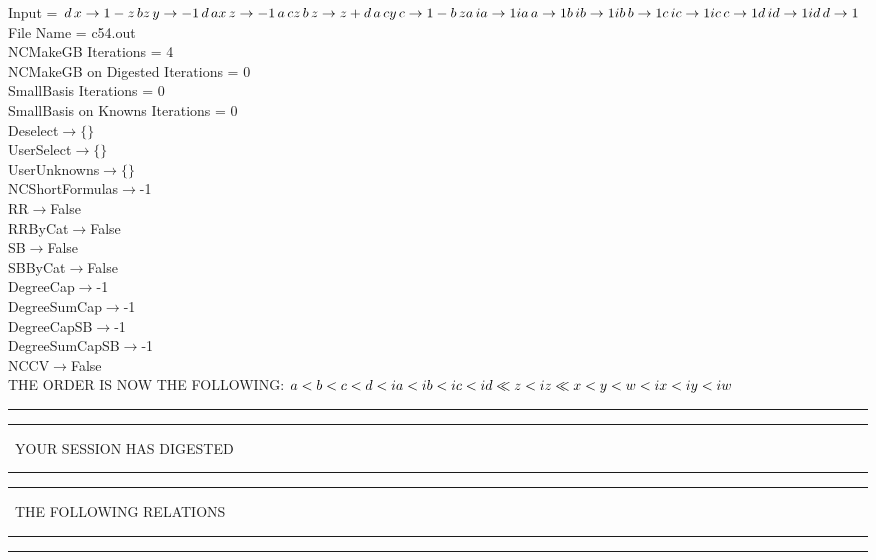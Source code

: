 \documentclass[rep10,leqno]{report}
\begin{document}
\normalsize
\baselineskip=12pt
\noindent
Input = 
$
\\d\,
 x\rightarrow 1 - z\,
 b\\
z\,
 y\rightarrow -1\,
 d\,
 a\\
x\,
 z\rightarrow -1\,
 a\,
 c\\
z\,
 b\,
 z\rightarrow z + d\,
 a\,
 c\\
y\,
 c\rightarrow 1 - b\,
 z\\
a\,
 ia\rightarrow 1\\
ia\,
 a\rightarrow 1\\
b\,
 ib\rightarrow 1\\
ib\,
 b\rightarrow 1\\
c\,
 ic\rightarrow 1\\
ic\,
 c\rightarrow 1\\
d\,
 id\rightarrow 1\\
id\,
 d\rightarrow 1\\
$
File Name = c54.out\\
NCMakeGB Iterations = 4\\
NCMakeGB on Digested Iterations = 0\\
SmallBasis Iterations = 0\\
SmallBasis on Knowns Iterations = 0\\
Deselect$\rightarrow \{\}$\\
UserSelect$\rightarrow \{\}$\\
UserUnknowns$\rightarrow \{\}$\\
NCShortFormulas$\rightarrow$-1\\
RR$\rightarrow $False\\
RRByCat$\rightarrow $False\\
SB$\rightarrow $False\\
SBByCat$\rightarrow $False\\
DegreeCap$\rightarrow $-1\\
DegreeSumCap$\rightarrow $-1\\
DegreeCapSB$\rightarrow $-1\\
DegreeSumCapSB$\rightarrow $-1\\
NCCV$\rightarrow $False\\
THE ORDER IS NOW THE FOLLOWING:\hfil\break
$
a<b<c<d<ia<ib<ic<id\ll
z<iz\ll
x<y<w<ix<iy<iw\\
$
\rule[2pt]{6in}{4pt}\hfil\break
\rule[2pt]{1.879in}{4pt}
\ YOUR SESSION HAS DIGESTED\ 
\rule[2pt]{1.879in}{4pt}\hfil\break
\rule[2pt]{1.923in}{4pt}
\ THE FOLLOWING RELATIONS\ 
\rule[2pt]{1.923in}{4pt}\hfil\break
\rule[2pt]{6in}{4pt}\hfil\break
\end{document}
